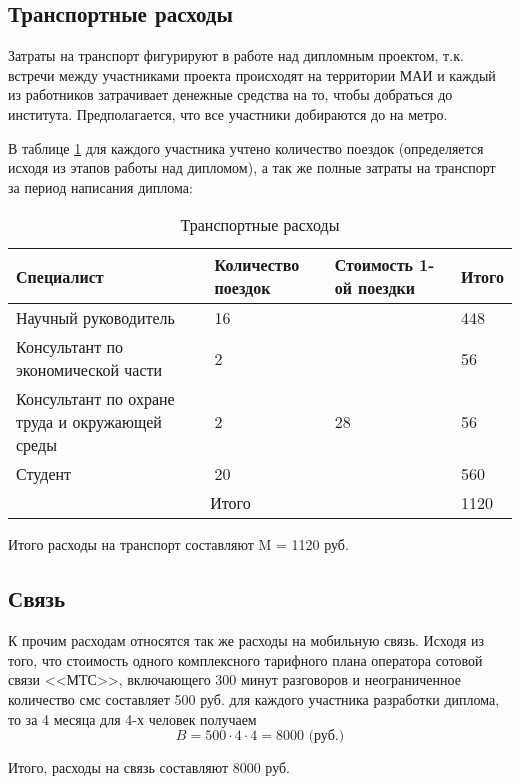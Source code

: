 \subsection{Транспортные расходы}

Затраты на транспорт фигурируют в работе над дипломным проектом, т.к. встречи между участниками проекта происходят на территории МАИ и каждый из работников затрачивает денежные средства на то, чтобы добрать\-ся до института. Предполагается, что все участники добираются до на метро.

В таблице \ref{transport} для каждого участника учтено количество поездок (опреде\-ляется исходя из этапов работы над дипломом), а так же полные затраты на транспорт за период написания диплома:
\begin{table}[H]
\caption{Транспортные расходы \label{transport}}
\begin{center}
\begin{tabular}{|p{3.5cm}|p{2.8cm}|p{2.6cm}|p{2.8cm}|}
\hline
Специалист&Количество поездок&Стоимость 1-ой поездки&Итого\\
\hline
Научный руководитель&16&&448\\
\cline{1-2}\cline{4-4}Консультант по экономической части&2&&56\\
\cline{1-2}\cline{4-4}Консультант по охране труда и окружающей среды&2&28&56\\
\cline{1-2}\cline{4-4}Студент&20&&560\\
\hline
\multicolumn{3}{|c|}{Итого}&1120\\
\hline
\end{tabular}
\end{center}
\end{table}

Итого расходы на транспорт составляют M = 1120 руб.

\subsection{Связь}

К прочим расходам относятся так же расходы на мобильную связь. Исходя из того, что стоимость одного комплексного тарифного плана оператора со\-товой связи <<МТС>>, включающего 300 минут разговоров и неограниченное количество смс составляет 500 руб. для каждого участника разработки дип\-лома, то за 4 месяца для 4-х человек получаем
$$
B = 500 \cdot 4 \cdot 4 = 8000 \mbox{ (руб.)}
$$

Итого, расходы на связь составляют 8000 руб.

